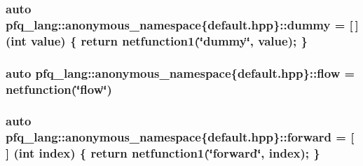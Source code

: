 \hypertarget{namespacepfq__lang_1_1anonymous__namespace_02default_8hpp_03_a876b4be1c6cf97e317f74242d8fb3da4}{
\subsubsection[{dummy}]{\setlength{\rightskip}{0pt plus 5cm}auto pfq\+\_\+lang\+::anonymous\+\_\+namespace\{default.\+hpp\}\+::dummy = \mbox{[}$\,$\mbox{]} (int value) \{ return {\bf netfunction1}(\char`\"{}dummy\char`\"{}, value); \}}}\label{namespacepfq__lang_1_1anonymous__namespace_02default_8hpp_03_a876b4be1c6cf97e317f74242d8fb3da4}
\hypertarget{namespacepfq__lang_1_1anonymous__namespace_02default_8hpp_03_a90497b962aed613834286418cd7ea722}{
\subsubsection[{flow}]{\setlength{\rightskip}{0pt plus 5cm}auto pfq\+\_\+lang\+::anonymous\+\_\+namespace\{default.\+hpp\}\+::flow = {\bf netfunction}(\char`\"{}flow\char`\"{})}}\label{namespacepfq__lang_1_1anonymous__namespace_02default_8hpp_03_a90497b962aed613834286418cd7ea722}
\hypertarget{namespacepfq__lang_1_1anonymous__namespace_02default_8hpp_03_a7fbe4b2614dd240727bf1696b4d06523}{
\subsubsection[{forward}]{\setlength{\rightskip}{0pt plus 5cm}auto pfq\+\_\+lang\+::anonymous\+\_\+namespace\{default.\+hpp\}\+::forward = \mbox{[}$\,$\mbox{]} (int index) \{ return {\bf netfunction1}(\char`\"{}forward\char`\"{}, index); \}}}\label{namespacepfq__lang_1_1anonymous__namespace_02default_8hpp_03_a7fbe4b2614dd240727bf1696b4d06523}
